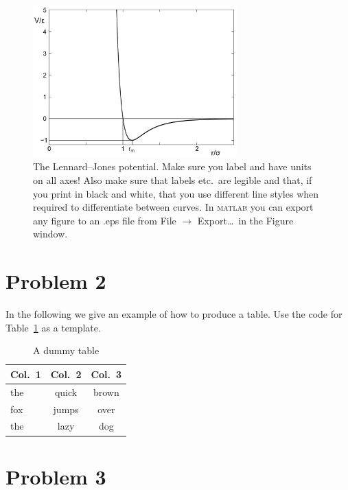 \begin{figure}[!ht]
\begin{center}
  \includegraphics[width=0.7\textwidth]{template_files/LJ} 
  \caption{The Lennard--Jones potential.
  Make sure you label and have units on all axes! Also make sure that labels etc.\
  are legible and that, if you print in black and white, that you use different line
  styles when required to differentiate between curves. In \textsc{matlab}
  you can export any figure to an .eps file from File $\rightarrow$
  Export\ldots\ in the Figure window.}
  \label{fig1}
\end{center}
\end{figure}
  
\section*{Problem 2}

In the following we give an example of how to produce a table.
Use the code for Table~\ref{tab1} as a template.

\begin{table}[!ht]
  \begin{center}
    \caption{A dummy table}
    \begin{tabular}{l|c|c}\hline\hline
      \textbf{Col.~1} & \textbf{Col.~2} & \textbf{Col.~3} \\ \hline
      the & quick & brown \\ 
      fox & jumps & over \\ 
      the & lazy  & dog \\ 
      \hline\hline
    \end{tabular}
    \label{tab1}
  \end{center}
\end{table}

\section*{Problem 3}

